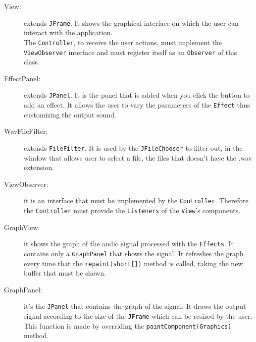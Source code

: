 \newpage
\begin{description}
  \item[View:] extends \texttt{JFrame}. It shows the
    graphical interface on which the user can interact with the
    application.\\
    The \texttt{Controller}, to receive the user actions,
    must implement the \texttt{ViewObserver} interface and must register
    itself as an \texttt{Observer} of this class.
  \item[EffectPanel:] extends \texttt{JPanel}. It
    is the panel that is added when you click the button to add an
    effect.
    It allows the user to vary the parameters of the \texttt{Effect}
    thus customizing the output sound.
  \item[WavFileFilter:] extends \texttt{FileFilter}. It is used
    by the \texttt{JFileChooser} to filter out, in the window that
    allows user to select a file, the files that doesn't have the .wav
    extension.
  \item[ViewObserver:] it is an interface that must be
    implemented by the \texttt{Controller}. Therefore the
    \texttt{Controller} must provide the \texttt{Listeners} of the
    \texttt{View}'s components.
  \item[GraphView:] it shows the graph of the audio signal processed
    with the \texttt{Effects}. It contains only a \texttt{GraphPanel}
    that shows the signal.   
    It refreshes the graph every time that the \texttt{repaint(short[])}
    method is called, taking the new buffer that must be shown.
  \item[GraphPanel:] it's the \texttt{JPanel} that contains the graph
    of the signal. It draws the output signal according to the size of
    the \texttt{JFrame} which can be resized by the user.
    This function is made by overriding the \texttt{paintComponent(Graphics)}
    method.
\end{description}

